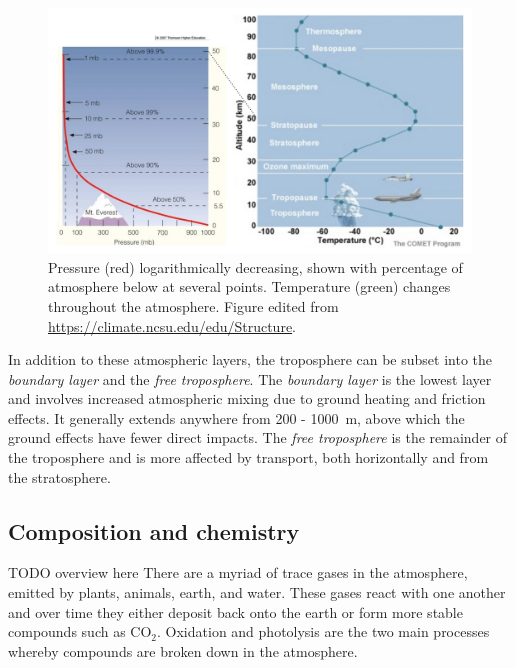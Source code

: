     \begin{figure}
      \includegraphics[width=\textwidth]{Figures/Atmos_Temp_Press.jpg}
      \caption{%
        Pressure (red) logarithmically decreasing, shown with percentage of atmosphere below at several points.
        Temperature (green) changes throughout the atmosphere.
        Figure edited from \url{https://climate.ncsu.edu/edu/Structure}.
      }
      \label{LR:Atmos:Struct:Fig_atmos_layers}
    \end{figure}
    
    
    
    In addition to these atmospheric layers, the troposphere can be subset into the \textit{boundary layer} and the \textit{free troposphere}.
    The \textit{boundary layer} is the lowest layer and involves increased atmospheric mixing due to ground heating and friction effects.
    It generally extends anywhere from 200 - 1000~m, above which the ground effects have fewer direct impacts.
    The \textit{free troposphere} is the remainder of the troposphere and is more affected by transport, both horizontally and from the stratosphere.
    
    
  \subsection{Composition and chemistry}
  \label{LR:Atmos:Chem}
    TODO overview here
    There are a myriad of trace gases in the atmosphere, emitted by plants, animals, earth, and water. 
    These gases react with one another and over time they either deposit back onto the earth or form more stable compounds such as CO$_2$.
    Oxidation and photolysis are the two main processes whereby compounds are broken down in the atmosphere.
    
